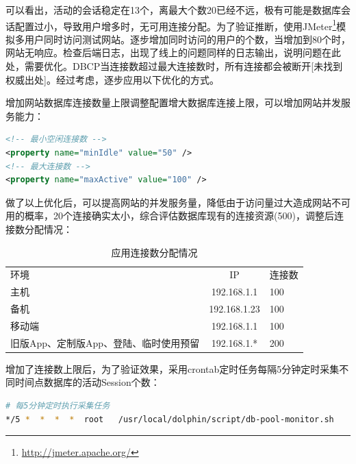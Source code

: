\documentclass[8pt]{book}
\makeatletter
\numberwithin{dummy}{section}
\theoremstyle{ocrenumbox}
\theoremstyle{blacknumex}
\theoremstyle{blacknumbox}
\theoremstyle{ocrenum}
\renewcommand\paragraph{\@startsection{paragraph}{4}{\z@}
	{-2ex \@plus-.2ex \@minus .2ex}
	{.1ex}
	{\normalfont\small\sffamily\bfseries}}
\makeatother
\begin{document}
可以看出，活动的会话稳定在13个，离最大个数20已经不远，极有可能是数据库会话配置过小，导致用户增多时，无可用连接分配。为了验证推断，使用JMeter\footnote{\url{http://jmeter.apache.org/}}模拟多用户同时访问测试网站。逐步增加同时访问的用户的个数，当增加到80个时，网站无响应。检查后端日志，出现了线上的问题同样的日志输出，说明问题在此处，需要优化。DBCP当连接数超过最大连接数时，所有连接都会被断开[未找到权威出处]。经过考虑，逐步应用以下优化的方式。

\paragraph{增加网站数据库连接数量上限}调整配置增大数据库连接上限，可以增加网站并发服务能力：

\begin{lstlisting}[language=XML]
<!-- 最小空闲连接数 -->
<property name="minIdle" value="50" />
<!-- 最大连接数 -->
<property name="maxActive" value="100" />
\end{lstlisting}

做了以上优化后，可以提高网站的并发服务量，降低由于访问量过大造成网站不可用的概率，20个连接确实太小，综合评估数据库现有的连接资源(500)，调整后连接数分配情况：

\begin{table}[htbp]
	\caption{应用连接数分配情况}
	\label{table:projectdirectionayinfo}
	\begin{center}
		\begin{tabular}{|p{5cm}|c|p{2cm}|}
			\hline
			\multirow{1}{*}{环境}
			& \multicolumn{1}{c|}{IP} 
			& \multicolumn{1}{c|}{连接数}\\			
			\cline{1-3}
			主机 &  192.168.1.1  & 100 \\
			\hline
			备机 &  192.168.1.23  & 100 \\
			\hline
			移动端 &  192.168.1.1  & 100 \\
			\hline
			旧版App、定制版App、登陆、临时使用预留 &  192.168.1.*  & 200 \\
			\hline									
		\end{tabular}	
	\end{center}
\end{table}

增加了连接数上限后，为了验证效果，采用crontab定时任务每隔5分钟定时采集不同时间点数据库的活动Session个数：

\begin{lstlisting}[language=Bash]
# 每5分钟定时执行采集任务
*/5 *  *  *  *  root   /usr/local/dolphin/script/db-pool-monitor.sh
\end{lstlisting}
\end{document}
